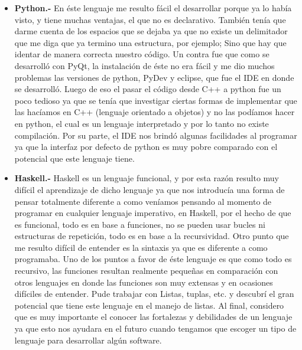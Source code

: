 \documentclass[10pt,oneside]{report}
\begin{document}
\begin{itemize}
	\item {\bf Python.-}  \textsf{En éste lenguaje me resulto fácil el desarrollar porque ya lo había visto, y tiene muchas ventajas, el que no es declarativo. También tenía que darme cuenta de los espacios que se dejaba ya que no existe un delimitador que me diga que ya termino una estructura, por ejemplo; Sino que hay que identar de manera correcta nuestro código. Un contra fue que como se desarrolló con PyQt, la instalación de éste no era fácil y me dio muchos problemas las versiones de python, PyDev y eclipse, que fue el IDE en donde se desarrolló. Luego de eso el pasar el código desde C++ a python fue un poco tedioso ya que se tenía que investigar ciertas formas de implementar que las hacíamos en C++ (lenguaje orientado a objetos) y no las podíamos hacer en python, el cual es un lenguaje interpretado y por lo tanto no existe compilación. Por su parte, el IDE nos brindó algunas facilidades al programar ya que la interfaz por defecto de python es muy pobre comparado con el potencial que este lenguaje tiene.}
	\item {\bf Haskell.-} {Haskell es un lenguaje funcional, y por esta razón resulto muy difícil el aprendizaje de dicho lenguaje ya que nos introducía una forma de pensar totalmente diferente a como veníamos pensando al momento de programar en cualquier lenguaje imperativo, en Haskell, por el hecho de que es funcional, todo es en base a funciones, no se pueden usar bucles ni estructuras de repetición, todo es en base a la recursividad. Otro punto que me resulto difícil de entender es la sintaxis ya que es diferente a como programaba. Uno de los puntos a favor de éste lenguaje es que como todo es recursivo, las funciones resultan realmente pequeñas en comparación con otros lenguajes en donde las funciones son muy extensas y en ocasiones difíciles de entender. Pude trabajar con Listas, tuplas, etc. y descubrí el gran potencial que tiene este lenguaje en el manejo de listas. Al final, considero que es muy importante el conocer las fortalezas y debilidades de un lenguaje ya que esto nos ayudara en el futuro cuando tengamos que escoger un tipo de lenguaje para desarrollar algún software.}
\end{itemize}
\end{document}

